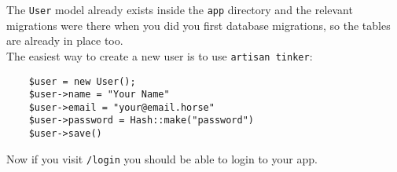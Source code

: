 The \texttt{User} model already exists inside the \texttt{app} directory and the relevant migrations were there when you did you first database migrations, so the tables are already in place too.
\\

The easiest way to create a new user is to use \texttt{artisan tinker}:

\begin{verbatim}
    $user = new User();
    $user->name = "Your Name"
    $user->email = "your@email.horse"
    $user->password = Hash::make("password")
    $user->save()
\end{verbatim}

Now if you visit \texttt{/login} you should be able to login to your app.

\pagebreak



